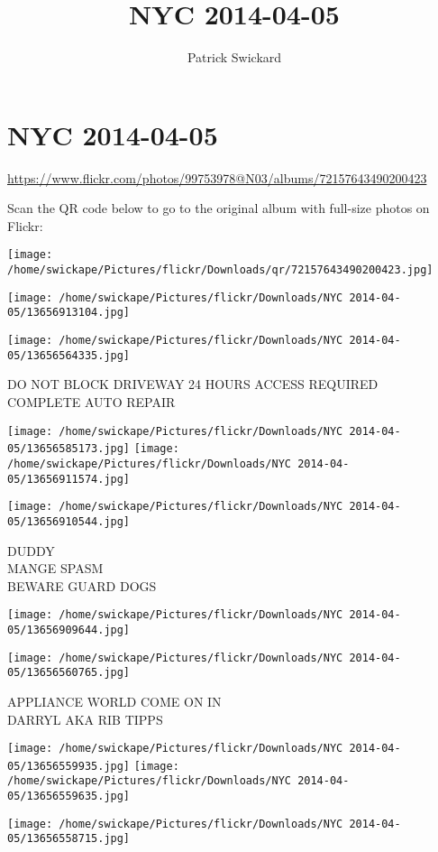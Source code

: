 \documentclass[10pt,letterpaper]{article}
\title{NYC 2014-04-05}
\author{Patrick Swickard}
\date{}
\begin{document}
\section*{NYC 2014-04-05}

\url{https://www.flickr.com/photos/99753978@N03/albums/72157643490200423}

Scan the QR code below to go to the original album with full-size photos on Flickr:

\texttt{[image: /home/swickape/Pictures/flickr/Downloads/qr/72157643490200423.jpg]}
\pagebreak

\texttt{[image: /home/swickape/Pictures/flickr/Downloads/NYC 2014-04-05/13656913104.jpg]}

\vspace{0.25in}
\texttt{[image: /home/swickape/Pictures/flickr/Downloads/NYC 2014-04-05/13656564335.jpg]}

DO NOT BLOCK DRIVEWAY 24 HOURS ACCESS REQUIRED\\
COMPLETE AUTO REPAIR
\pagebreak

\texttt{[image: /home/swickape/Pictures/flickr/Downloads/NYC 2014-04-05/13656585173.jpg]}
\texttt{[image: /home/swickape/Pictures/flickr/Downloads/NYC 2014-04-05/13656911574.jpg]}

\vspace{0.25in}
\texttt{[image: /home/swickape/Pictures/flickr/Downloads/NYC 2014-04-05/13656910544.jpg]}

DUDDY\\
MANGE SPASM\\
BEWARE GUARD DOGS
\pagebreak

\texttt{[image: /home/swickape/Pictures/flickr/Downloads/NYC 2014-04-05/13656909644.jpg]}

\vspace{0.25in}
\texttt{[image: /home/swickape/Pictures/flickr/Downloads/NYC 2014-04-05/13656560765.jpg]}

APPLIANCE WORLD COME ON IN\\
DARRYL AKA RIB TIPPS
\pagebreak

\texttt{[image: /home/swickape/Pictures/flickr/Downloads/NYC 2014-04-05/13656559935.jpg]}
\texttt{[image: /home/swickape/Pictures/flickr/Downloads/NYC 2014-04-05/13656559635.jpg]}

\vspace{0.25in}
\texttt{[image: /home/swickape/Pictures/flickr/Downloads/NYC 2014-04-05/13656558715.jpg]}
\end{document}
